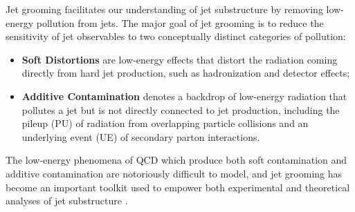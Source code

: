 Jet grooming facilitates our understanding of jet substructure by removing low-energy pollution from jets.
%
The major goal of jet grooming is to reduce the sensitivity of jet observables to two conceptually distinct categories of pollution:
\begin{itemize}
    \item
    \textbf{Soft Distortions}
    are low-energy effects that distort the radiation coming directly from hard jet production, such as hadronization and detector effects;

    \item
    \textbf{Additive Contamination}
    denotes a backdrop of low-energy radiation that pollutes a jet but is not directly connected to jet production, including the pileup (PU) of radiation from overlapping particle collisions and an underlying event (UE) of secondary parton interactions.
\end{itemize}
The low-energy phenomena of QCD which produce both soft contamination and additive contamination are notoriously difficult to model, and jet grooming has become an important toolkit used to empower both experimental and theoretical analyses of jet substructure
\cite{Krohn:2009th,Ellis:2009me,Larkoski:2014wba,Dasgupta:2013ihk,Dasgupta:2013via,Tseng:2013dva,Dasgupta:2016ktv,Thaler:2008ju,Thaler:2011gf,Hook:2011cq,Gallicchio:2011xq,Soper:2012pb,Gallicchio:2012ez,CMS-PAS-JME-09-001,CMS-PAS-EXO-09-002,CMS:2013kfa,ATL-PHYS-PUB-2009-081,ATL-PHYS-PUB-2010-008,Cui:2010km,ATLAS-CONF-2011-053,Chatrchyan:2013rla,Larkoski:2013eya,Dasgupta:2012hg,Backovic:2013bga,ATLAS-CONF-2013-084,Komiske:2018vkc,Komiske:2016rsd,Metodiev:2018ftz,Krohn:2012fg,MERINO:2013tta,Bhattacherjee:2016bpy,Macaluso:2018tck,Egan:2017ojy,Kasieczka:2017nvn,Pearkes:2017hku,Butter:2017cot,Catani:1992ua,Dokshitzer:1998kz,Dasgupta:2001sh,Banfi:2004yd,Banfi:2005gj,Ellis:2009su,Banfi:2010pa,Walsh:2011fz,Chien:2012ur,Li:2012bw,Jouttenus:2013hs,Hatta:2013iba,Larkoski:2014tva,Procura:2018zpn,Aaboud:2017aca,Frye:2016aiz, Almeida:2008yp,Larkoski:2017iuy,Larkoski:2017cqq,Thaler:2010tr,Abdesselam:2010pt,Katz:2010mr,Gallicchio:2010dq,Adams:2015hiv,Sirunyan:2017ezt,Moore:2018lsr,FerreiradeLima:2016gcz,Rubin:2010fc,Chatrchyan:2012sn,ATLAS:2019kwg,CMS-PAS-BTV-13-001,CMS-PAS-JME-13-006,Kribs:2009yh,Chen:2010wk,Hackstein:2010wk,Kim:2010uj,Almeida:2011aa,Pandolfi:2012ima,Vernieri:2014wfa,CMS-PAS-HIG-17-007,Procura:2014cba,ATL-PHYS-PUB-2019-027,Aad:2019vyi,ATLAS:2020gwe}.

